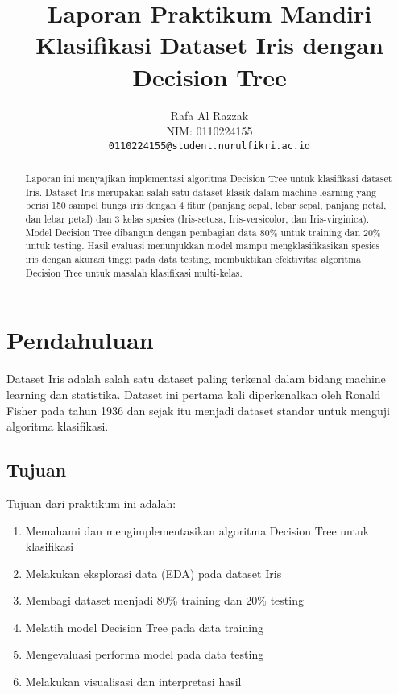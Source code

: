 \documentclass[11pt,a4paper]{article}
\title{\textbf{Laporan Praktikum Mandiri\\Klasifikasi Dataset Iris dengan Decision Tree}}
\author{Rafa Al Razzak \\ NIM: 0110224155 \\ \texttt{0110224155@student.nurulfikri.ac.id}}
\date{}
\begin{document}
\maketitle

\begin{abstract}
Laporan ini menyajikan implementasi algoritma Decision Tree untuk klasifikasi dataset Iris. Dataset Iris merupakan salah satu dataset klasik dalam machine learning yang berisi 150 sampel bunga iris dengan 4 fitur (panjang sepal, lebar sepal, panjang petal, dan lebar petal) dan 3 kelas spesies (Iris-setosa, Iris-versicolor, dan Iris-virginica). Model Decision Tree dibangun dengan pembagian data 80\% untuk training dan 20\% untuk testing. Hasil evaluasi menunjukkan model mampu mengklasifikasikan spesies iris dengan akurasi tinggi pada data testing, membuktikan efektivitas algoritma Decision Tree untuk masalah klasifikasi multi-kelas.
\end{abstract}

\section{Pendahuluan}

Dataset Iris adalah salah satu dataset paling terkenal dalam bidang machine learning dan statistika. Dataset ini pertama kali diperkenalkan oleh Ronald Fisher pada tahun 1936 dan sejak itu menjadi dataset standar untuk menguji algoritma klasifikasi.

\subsection{Tujuan}
Tujuan dari praktikum ini adalah:
\begin{enumerate}
    \item Memahami dan mengimplementasikan algoritma Decision Tree untuk klasifikasi
    \item Melakukan eksplorasi data (EDA) pada dataset Iris
    \item Membagi dataset menjadi 80\% training dan 20\% testing
    \item Melatih model Decision Tree pada data training
    \item Mengevaluasi performa model pada data testing
    \item Melakukan visualisasi dan interpretasi hasil
\end{enumerate}
\end{document}
